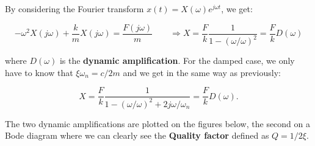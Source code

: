 			By considering the Fourier transform $x(t) = X(\omega )e^{j\omega t}$, we get:
			
			\begin{equation}
			-\omega ^2 X(j\omega) + \frac{k}{m} X(j\omega) = \frac{F(j\omega)}{m} \qquad \Rightarrow X = \frac{F}{k} \frac{1}{1-(\omega / \omega)^2} = \frac{F}{k} D(\omega)
			\end{equation}
			
			where $D(\omega)$ is the \textbf{dynamic amplification}. For the damped case, we only have to know that $\xi \omega _n = c/2m$ and we get in the same way as previously:
			
			\begin{equation}
			X = \frac{F}{k}\frac{1}{1-(\omega / \omega)^2 + 2j\omega / \omega _n } = \frac{F}{k} D(\omega).
			\end{equation}
			
			The two dynamic amplifications are plotted on the figures below, the second on a Bode diagram where we can clearly see the \textbf{Quality factor} defined as $Q = 1/2\xi$. 
			
